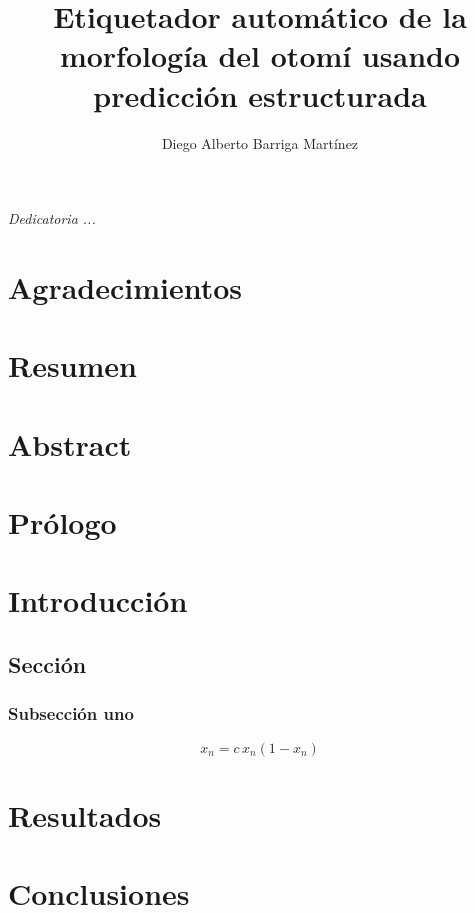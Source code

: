 \documentclass[letterpaper,12pt,oneside]{book}
\author{Diego Alberto Barriga Martínez}
\title{Etiquetador automático de la morfología del otomí usando predicción estructurada}
\begin{document}
\maketitle
\chapter*{}
\begin{flushright}%
  \emph{Dedicatoria ...}
  \thispagestyle{empty}
\end{flushright}

\chapter{Agradecimientos}

\chapter{Resumen}

\chapter{Abstract}


\tableofcontents
\listoffigures

\chapter{Prólogo}
    

\chapter{Introducción} 


\section{Secci\'on}
    
    \subsection{Subsecci\'on uno}
    \begin{equation}
    	x_n = c \, x_n(1 - x_n)
    	\label{Ec:logis}
    \end{equation}

\chapter{Resultados}  %

\chapter{Conclusiones}  %

%
%

\backmatter%
\end{document}
